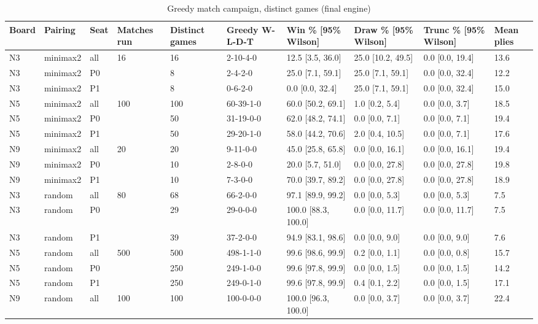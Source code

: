 \begin{table}[htbp]
\centering
\caption{Greedy match campaign, distinct games (final engine)}
\label{tab:greedy_campaign}
\begin{tabular}{llllllllll}
\toprule
Board & Pairing & Seat & Matches run & Distinct games & Greedy W-L-D-T & Win \% [95\% Wilson] & Draw \% [95\% Wilson] & Trunc \% [95\% Wilson] & Mean plies \\
\midrule
N3 & minimax2 & all & 16 & 16 & 2-10-4-0 & 12.5 [3.5, 36.0] & 25.0 [10.2, 49.5] & 0.0 [0.0, 19.4] & 13.6 \\
N3 & minimax2 & P0 &  & 8 & 2-4-2-0 & 25.0 [7.1, 59.1] & 25.0 [7.1, 59.1] & 0.0 [0.0, 32.4] & 12.2 \\
N3 & minimax2 & P1 &  & 8 & 0-6-2-0 & 0.0 [0.0, 32.4] & 25.0 [7.1, 59.1] & 0.0 [0.0, 32.4] & 15.0 \\
N5 & minimax2 & all & 100 & 100 & 60-39-1-0 & 60.0 [50.2, 69.1] & 1.0 [0.2, 5.4] & 0.0 [0.0, 3.7] & 18.5 \\
N5 & minimax2 & P0 &  & 50 & 31-19-0-0 & 62.0 [48.2, 74.1] & 0.0 [0.0, 7.1] & 0.0 [0.0, 7.1] & 19.4 \\
N5 & minimax2 & P1 &  & 50 & 29-20-1-0 & 58.0 [44.2, 70.6] & 2.0 [0.4, 10.5] & 0.0 [0.0, 7.1] & 17.6 \\
N9 & minimax2 & all & 20 & 20 & 9-11-0-0 & 45.0 [25.8, 65.8] & 0.0 [0.0, 16.1] & 0.0 [0.0, 16.1] & 19.4 \\
N9 & minimax2 & P0 &  & 10 & 2-8-0-0 & 20.0 [5.7, 51.0] & 0.0 [0.0, 27.8] & 0.0 [0.0, 27.8] & 19.8 \\
N9 & minimax2 & P1 &  & 10 & 7-3-0-0 & 70.0 [39.7, 89.2] & 0.0 [0.0, 27.8] & 0.0 [0.0, 27.8] & 18.9 \\
N3 & random & all & 80 & 68 & 66-2-0-0 & 97.1 [89.9, 99.2] & 0.0 [0.0, 5.3] & 0.0 [0.0, 5.3] & 7.5 \\
N3 & random & P0 &  & 29 & 29-0-0-0 & 100.0 [88.3, 100.0] & 0.0 [0.0, 11.7] & 0.0 [0.0, 11.7] & 7.5 \\
N3 & random & P1 &  & 39 & 37-2-0-0 & 94.9 [83.1, 98.6] & 0.0 [0.0, 9.0] & 0.0 [0.0, 9.0] & 7.6 \\
N5 & random & all & 500 & 500 & 498-1-1-0 & 99.6 [98.6, 99.9] & 0.2 [0.0, 1.1] & 0.0 [0.0, 0.8] & 15.7 \\
N5 & random & P0 &  & 250 & 249-1-0-0 & 99.6 [97.8, 99.9] & 0.0 [0.0, 1.5] & 0.0 [0.0, 1.5] & 14.2 \\
N5 & random & P1 &  & 250 & 249-0-1-0 & 99.6 [97.8, 99.9] & 0.4 [0.1, 2.2] & 0.0 [0.0, 1.5] & 17.1 \\
N9 & random & all & 100 & 100 & 100-0-0-0 & 100.0 [96.3, 100.0] & 0.0 [0.0, 3.7] & 0.0 [0.0, 3.7] & 22.4 \\

\end{tabular}
\end{table}
